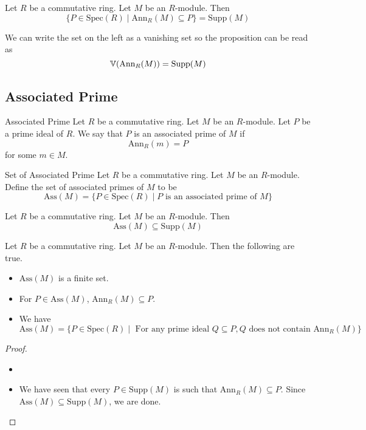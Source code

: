 \documentclass[a4paper]{article}
\begin{document}
\begin{prp}{}{} Let $R$ be a commutative ring. Let $M$ be an $R$-module. Then $$\{P\in\text{Spec}(R)\;|\;\text{Ann}_R(M)\subseteq P\}=\text{Supp}(M)$$
\end{prp}

We can write the set on the left as a vanishing set so the proposition can be read as $$\mathbb{V}(\text{Ann}_R(M))=\text{Supp}(M)$$

\subsection{Associated Prime}
\begin{defn}{Associated Prime}{} Let $R$ be a commutative ring. Let $M$ be an $R$-module. Let $P$ be a prime ideal of $R$. We say that $P$ is an associated prime of $M$ if $$\text{Ann}_R(m)=P$$ for some $m\in M$. 
\end{defn}

\begin{defn}{Set of Associated Prime}{} Let $R$ be a commutative ring. Let $M$ be an $R$-module. Define the set of associated primes of $M$ to be $$\text{Ass}(M)=\{P\in\text{Spec}(R)\;|\;P\text{ is an associated prime of }M\}$$
\end{defn}

\begin{prp}{}{} Let $R$ be a commutative ring. Let $M$ be an $R$-module. Then $$\text{Ass}(M)\subseteq\text{Supp}(M)$$
\end{prp}

\begin{prp}{}{} Let $R$ be a commutative ring. Let $M$ be an $R$-module. Then the following are true. 
\begin{itemize}
\item $\text{Ass}(M)$ is a finite set. 
\item For $P\in\text{Ass}(M)$, $\text{Ann}_R(M)\subseteq P$. 
\item We have $$\text{Ass}(M)=\{P\in\text{Spec}(R)\;|\;\text{ For any prime ideal }Q\subseteq P, Q\text{ does not contain }\text{Ann}_R(M)\}$$
\end{itemize} \tcbline
\begin{proof}~\\
\begin{itemize}
\item 
\item We have seen that every $P\in\text{Supp}(M)$ is such that $\text{Ann}_R(M)\subseteq P$. Since $\text{Ass}(M)\subseteq\text{Supp}(M)$, we are done. 
\end{itemize}
\end{proof}
\end{prp}
\end{document}
